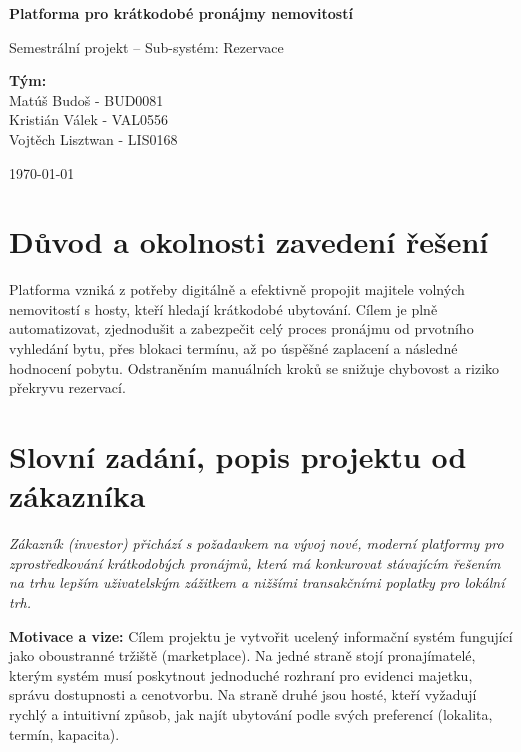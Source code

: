 \documentclass[11pt, a4paper]{article}
\begin{document}
\begin{titlepage}
    \centering
    \vspace*{4cm}
    
    {\Huge \textbf{Platforma pro krátkodobé pronájmy nemovitostí}}
    
    \vspace{1.5cm}
    {\Large Semestrální projekt -- Sub-systém: Rezervace}
    
    \vspace{3cm}
    
    \begin{flushleft}
        \large
        
        \textbf{Tým:} \\
        Matúš Budoš - BUD0081 \\
        Kristián Válek - VAL0556 \\
        Vojtěch Lisztwan - LIS0168 \\
    \end{flushleft}
    
    \vfill
    
    {\large \today}
\end{titlepage}

\tableofcontents
\newpage


\section{Důvod a okolnosti zavedení řešení}
Platforma vzniká z potřeby digitálně a efektivně propojit majitele volných nemovitostí s hosty, kteří hledají krátkodobé ubytování. Cílem je plně automatizovat, zjednodušit a zabezpečit celý proces pronájmu od prvotního vyhledání bytu, přes blokaci termínu, až po úspěšné zaplacení a následné hodnocení pobytu. Odstraněním manuálních kroků se snižuje chybovost a riziko překryvu rezervací.

\section{Slovní zadání, popis projektu od zákazníka}
\textit{Zákazník (investor) přichází s požadavkem na vývoj nové, moderní platformy pro zprostředkování krátkodobých pronájmů, která má konkurovat stávajícím řešením na trhu lepším uživatelským zážitkem a nižšími transakčními poplatky pro lokální trh.}

\vspace{0.3cm}
\noindent \textbf{Motivace a vize:} 
Cílem projektu je vytvořit ucelený informační systém fungující jako oboustranné tržiště (marketplace). Na jedné straně stojí pronajímatelé, kterým systém musí poskytnout jednoduché rozhraní pro evidenci majetku, správu dostupnosti a cenotvorbu. Na straně druhé jsou hosté, kteří vyžadují rychlý a intuitivní způsob, jak najít ubytování podle svých preferencí (lokalita, termín, kapacita).
\end{document}
